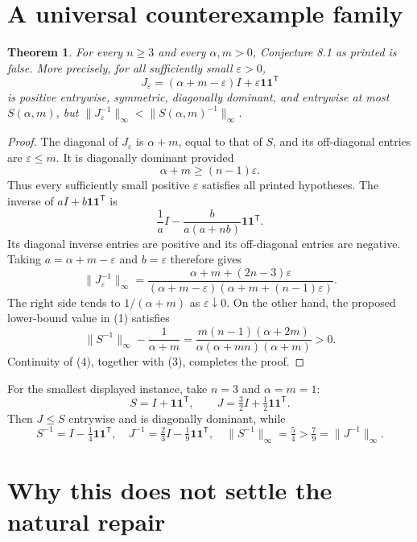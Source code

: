 \documentclass[10pt]{article}
\newtheorem{theorem}{Theorem}
\newcommand{\one}{\mathbf 1}
\begin{document}
\section*{A universal counterexample family}

\begin{theorem}\label{thm:counterexample}
For every $n\ge3$ and every $\alpha,m>0$, Conjecture 8.1 as printed is false.
More precisely, for all sufficiently small $\varepsilon>0$,
\[
 J_\varepsilon=(\alpha+m-\varepsilon)I
                  +\varepsilon\one\one^{\mathsf T}        \tag{2}
\]
is positive entrywise, symmetric, diagonally dominant, and entrywise at most
$S(\alpha,m)$, but
$\|J_\varepsilon^{-1}\|_\infty<\|S(\alpha,m)^{-1}\|_\infty$.
\end{theorem}

\begin{proof}
The diagonal of $J_\varepsilon$ is $\alpha+m$, equal to that of $S$, and
its off-diagonal entries are $\varepsilon\le m$.  It is diagonally dominant
provided
\[
                  \alpha+m\ge(n-1)\varepsilon.             \tag{3}
\]
Thus every sufficiently small positive $\varepsilon$ satisfies all printed
hypotheses.  The inverse of $aI+b\one\one^{\mathsf T}$ is
\[
 \frac1aI-\frac{b}{a(a+nb)}\one\one^{\mathsf T}.
\]
Its diagonal inverse entries are positive and its off-diagonal entries are
negative.  Taking $a=\alpha+m-\varepsilon$ and $b=\varepsilon$ therefore
gives
\[
 \|J_\varepsilon^{-1}\|_\infty
 =\frac{\alpha+m+(2n-3)\varepsilon}
 {(\alpha+m-\varepsilon)(\alpha+m+(n-1)\varepsilon)}.      \tag{4}
\]
The right side tends to $1/(\alpha+m)$ as $\varepsilon\downarrow0$.  On the
other hand, the proposed lower-bound value in (1) satisfies
\[
 \|S^{-1}\|_\infty-\frac1{\alpha+m}
 =\frac{m(n-1)(\alpha+2m)}
 {\alpha(\alpha+mn)(\alpha+m)}>0.                          \tag{5}
\]
Continuity of (4), together with (3), completes the proof.
\end{proof}

For the smallest displayed instance, take $n=3$ and $\alpha=m=1$:
\[
 S=I+\one\one^{\mathsf T},\qquad
 J=\tfrac32I+\tfrac12\one\one^{\mathsf T}.
\]
Then $J\le S$ entrywise and is diagonally dominant, while
\[
 S^{-1}=I-\tfrac14\one\one^{\mathsf T},\quad
 J^{-1}=\tfrac23I-\tfrac19\one\one^{\mathsf T},\quad
 \|S^{-1}\|_\infty=\tfrac54>\tfrac79=\|J^{-1}\|_\infty.
\]

\section*{Why this does not settle the natural repair}
\end{document}

